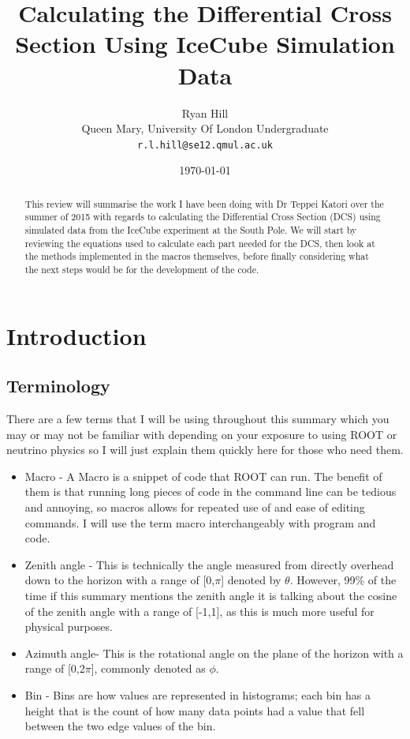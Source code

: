 \documentclass[12pt]{article}
\numberwithin{equation}{section}
\numberwithin{figure}{section}
\begin{document}
\title{Calculating the Differential Cross Section Using IceCube Simulation Data}
\author{Ryan Hill \\
Queen Mary, University Of London Undergraduate\\
\texttt{r.l.hill@se12.qmul.ac.uk}}
\date{\today}
\maketitle
\thispagestyle{empty}
%
\graphicspath{{images/}}
%
%
\begin{abstract}
This review will summarise the work I have been doing with Dr Teppei Katori over the summer of 2015 with regards to calculating the Differential Cross Section (DCS) using simulated data from the IceCube experiment at the South Pole. We will start by reviewing the equations used to calculate each part needed for the DCS, then look at the methods implemented in the macros themselves, before finally considering what the next steps would be for the development of the code.
\end{abstract}
%
\clearpage
%
\tableofcontents
\thispagestyle{empty}
%
\clearpage
%
\setcounter{page}{1}
\section{Introduction}
\subsection{Terminology} %
\label{sub:terminology}
There are a few terms that I will be using throughout this summary which you may or may not be familiar with depending on your exposure to using ROOT or neutrino physics so I will just explain them quickly here for those who need them.\\
\begin{itemize}
    \item Macro - A Macro is a snippet of code that ROOT can run. The benefit of them is that running long pieces of code in the command line can be tedious and annoying, so macros allows for repeated use of and ease of editing commands. I will use the term macro interchangeably with program and code.
    \item Zenith angle - This is technically the angle measured from directly overhead down to the horizon with a range of [0,$\pi$] denoted by $\theta$. However, 99\% of the time if this summary mentions the zenith angle it is talking about the cosine of the zenith angle with a range of [-1,1], as this is much more useful for physical purposes.
    \item Azimuth angle- This is the rotational angle on the plane of the horizon with a range of [0,2$\pi$], commonly denoted as $\phi$.
    \item Bin - Bins are how values are represented in histograms; each bin has a height that is the count of how many data points had a value that fell between the two edge values of the bin.
\end{itemize}
\end{document}
